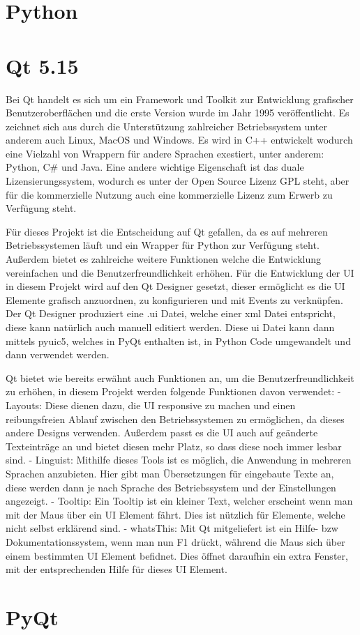 \section{Python}


\section{Qt 5.15}
Bei Qt handelt es sich um ein Framework und Toolkit zur Entwicklung grafischer Benutzeroberflächen und die erste Version wurde im Jahr 1995 veröffentlicht.
Es zeichnet sich aus durch die Unterstützung zahlreicher Betriebssystem unter anderem auch Linux, MacOS und Windows. Es wird in C++ entwickelt wodurch eine Vielzahl von Wrappern für andere Sprachen exestiert, unter anderem: Python, C# und Java.
Eine andere wichtige Eigenschaft ist das duale Lizensierungssystem, wodurch es unter der Open Source Lizenz GPL steht, aber für die kommerzielle Nutzung auch eine kommerzielle Lizenz zum Erwerb zu Verfügung steht.

Für dieses Projekt ist die Entscheidung auf Qt gefallen, da es auf mehreren Betriebssystemen läuft und ein Wrapper für Python zur Verfügung steht. Außerdem bietet es zahlreiche weitere Funktionen welche die Entwicklung vereinfachen und die Benutzerfreundlichkeit erhöhen.
Für die Entwicklung der UI in diesem Projekt wird auf den Qt Designer gesetzt, dieser ermöglicht es die UI Elemente grafisch anzuordnen, zu konfigurieren und mit Events zu verknüpfen. Der Qt Designer produziert eine .ui Datei, welche einer xml Datei entspricht, diese kann natürlich auch manuell editiert werden.
Diese ui Datei kann dann mittels pyuic5, welches in PyQt enthalten ist, in Python Code umgewandelt und dann verwendet werden.

Qt bietet wie bereits erwähnt auch Funktionen an, um die Benutzerfreundlichkeit zu erhöhen, in diesem Projekt werden folgende Funktionen davon verwendet:
- Layouts: Diese dienen dazu, die UI responsive zu machen und einen reibungsfreien Ablauf zwischen den Betriebssystemen zu ermöglichen, da dieses andere Designs verwenden. Außerdem passt es die UI auch auf geänderte Texteinträge an und bietet diesen mehr Platz, so dass diese noch immer lesbar sind.
- Linguist: Mithilfe dieses Tools ist es möglich, die Anwendung in mehreren Sprachen anzubieten. Hier gibt man Übersetzungen für eingebaute Texte an, diese werden dann je nach Sprache des Betriebssystem und der Einstellungen angezeigt.
- Tooltip: Ein Tooltip ist ein kleiner Text, welcher erscheint wenn man mit der Maus über ein UI Element fährt. Dies ist nützlich für Elemente, welche nicht selbst erklärend sind.
- whatsThis: Mit Qt mitgeliefert ist ein Hilfe- bzw Dokumentationssystem, wenn man nun F1 drückt, während die Maus sich über einem bestimmten UI Element befidnet. Dies öffnet daraufhin ein extra Fenster, mit der entsprechenden Hilfe für dieses UI Element.

\section{PyQt} 
